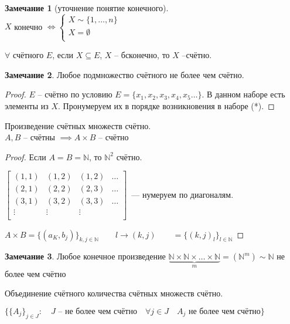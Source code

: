 \documentclass{book}
\newcommand\N{\ensuremath{\mathbb{N}}}
\renewcommand\O{\ensuremath{\emptyset}}
\theoremstyle{definition}
\newtheorem*{note}{Замечание}
\begin{document}
    \begin{note}
        [уточнение понятие конечного]~\\
        $X$ конечно $\iff \begin{cases}
            X\sim \{1, \ldots, n\}\\
            X = \O \\
        \end{cases}$

    \end{note}
    \begin{theorem}
        $\forall $ счётного $E$, если $X\subseteq E$, $X$ -- бсконечно, то $X$ --счётно.
    \end{theorem}
    \begin{note}
        Любое подмножество счётного не более чем счётно.
    \end{note}
    \begin{proof}
        $E$ -- счётно по условию $E = \{x_1, x_2, x_3, x_4, x_5 \ldots\}$.
        В данном наборе есть элементы  из $X$. Пронумеруем их в порядке возникновения в наборе (*).
    \end{proof}
    \begin{theorem}
        Произведение счётных множеств счётно.\\
        $A,B$ -- счётны $\implies A\times B$ -- счётно
    \end{theorem}
    \begin{proof}
        Если $A = B = \N$, то $\N ^2$ счётно.

        $\begin{bmatrix} (1,1)&(1,2)&(1,2)&\ldots\\ (2,1)&(2,2)&(2,3)&\ldots\\ (3,1)&(3,2)&(3,3)&\ldots\\ \vdots& \vdots& \vdots& \\ \end{bmatrix}$~--- нумеруем по диагоналям.

        $A\times B = \{(a_K, b_j)\}_{k,j\in \N }\qquad l\to (k,j)\qquad =\{(k,j)_l\}_{l\in \N }$
    \end{proof}
    \begin{note}
        Любое конечное произведение $\underbrace{\N \times \N \times \ldots\times \N }_{m} = (\N ^m) \sim  \N $ не более чем счётно

    \end{note}
    \begin{theorem}
        Объединение счётного количества счётных множеств счётно.
    \end{theorem}
        $\{\{A_j\}_{j\in J}:\quad J \text{ -- не более чем счётно} \quad \forall j\in J\quad A_j \text{ не более чем счётно}\}$
\end{document}
